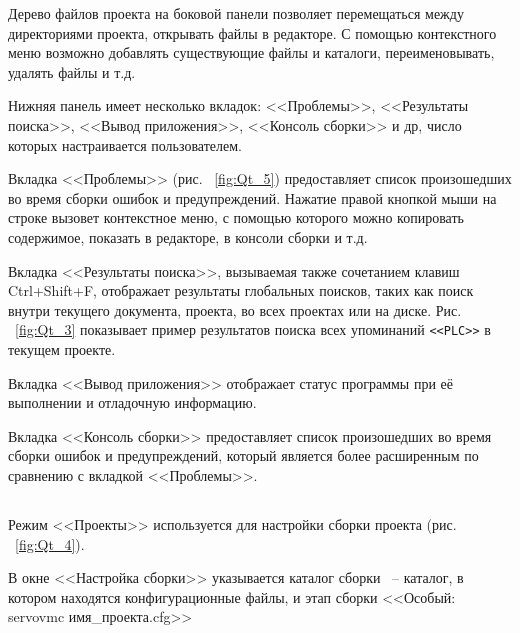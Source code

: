 Дерево файлов проекта на боковой панели позволяет перемещаться между директориями проекта, открывать файлы в редакторе. С помощью контекстного меню возможно добавлять существующие файлы и каталоги, переименовывать, удалять файлы и т.д.\killoverfullbefore

Нижняя панель имеет несколько вкладок: <<Проблемы>>,  <<Результаты поиска>>, <<Вывод приложения>>, <<Консоль сборки>> и др, число которых настраивается пользователем.\killoverfullbefore 

Вкладка <<Проблемы>> (рис. ~\ref{fig:Qt_5}) предоставляет список произошедших во время сборки ошибок и предупреждений. Нажатие правой кнопкой мыши на строке вызовет контекстное меню, с помощью которого можно копировать содержимое, показать в редакторе, в консоли сборки и т.д.\killoverfullbefore


Вкладка <<Результаты поиска>>, вызываемая также сочетанием клавиш Ctrl+Shift+F, отображает результаты глобальных поисков, таких как поиск внутри текущего документа, проекта, во всех проектах или на диске. Рис. ~\ref{fig:Qt_3} показывает пример результатов поиска всех упоминаний \texttt{<<PLC>>} в текущем проекте.\killoverfullbefore

Вкладка <<Вывод приложения>> отображает статус программы при её выполнении и отладочную информацию. 

Вкладка <<Консоль сборки>> предоставляет список произошедших во время сборки ошибок и предупреждений, который является более расширенным по сравнению с вкладкой <<Проблемы>>.\killoverfullbefore


\subsection{}

Режим <<Проекты>> используется для настройки сборки проекта (рис. ~\ref{fig:Qt_4}). 


В окне <<Настройка сборки>> указывается каталог сборки ~-- каталог, в котором находятся конфигурационные файлы, и этап сборки <<Особый: servovmc имя\_проекта.cfg>>\killoverfullbefore


